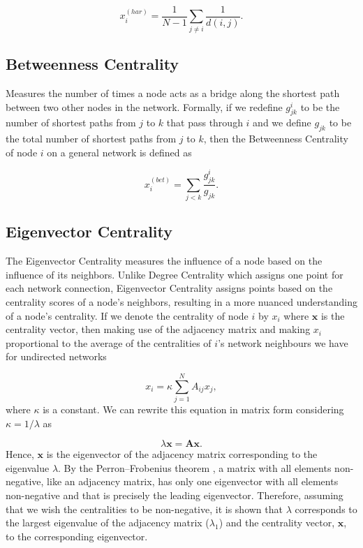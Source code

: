 \begin{equation}
    x_i^{(har)}= \frac{1}{N-1}\sum_{j\ne i}^{}\frac{1}{d(i,j)}.
\end{equation}

\subsection*{Betweenness Centrality} Measures the number of times a node acts as a bridge along the shortest path between two other nodes in the network. Formally, if we redefine $g_{jk}^i$ to be the number of shortest paths from $j$ to $k$ that pass through $i$ and we define $g_{jk}$ to be the total number of shortest paths from $j$ to $k$, then the Betweenness Centrality of node $i$ on a general network is defined as

\begin{equation}
    x_i^{(bet)}= \sum_{j<k}^{}\frac{g_{jk}^i}{g_{jk}}.
\end{equation}

\subsection*{Eigenvector Centrality} The Eigenvector Centrality measures the influence of a node based on the influence of its neighbors. Unlike Degree Centrality which assigns one point for each network connection, Eigenvector Centrality assigns points based on the centrality scores of a node's neighbors, resulting in a more nuanced understanding of a node's centrality. If we denote the centrality of node $i$ by $x_i$ where $\mathbf{x}$ is the centrality vector, then making use of the adjacency matrix and making $x_i$ proportional to the average of the centralities of $i$’s network neighbours we have for undirected networks

\begin{equation}
\label{eqn:eigc}
    x_i= \kappa\sum_{j=1}^{N}A_{ij}x_j,
\end{equation}
where $\kappa$ is a constant. We can rewrite this equation in matrix form considering $\kappa=1/\lambda$ as

\begin{equation}
    \lambda \mathbf{x} = \mathbf{A}\mathbf{x}.
\end{equation}
Hence, $\mathbf{x}$ is the eigenvector of the adjacency matrix corresponding to the eigenvalue $\lambda$. By the Perron–Frobenius theorem \cite{meyer2000matrix}, a matrix with all elements non-negative, like an adjacency matrix, has only one eigenvector with all elements non-negative and that is precisely the leading eigenvector. Therefore, assuming that we wish the centralities to be non-negative, it is shown that $\lambda$ corresponds to the largest eigenvalue of the adjacency matrix ($\lambda_1$) and the centrality vector, $\mathbf{x}$, to the corresponding eigenvector.

